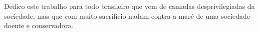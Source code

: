 
\hypersetup{pageanchor=false}

\capaime[port]

%



\begin{dedicatoria}
Dedico este trabalho para todo brasileiro que vem de camadas desprivilegiadas da sociedade, mas que com muito sacrifício nadam contra a maré de uma sociedade doente e conservadora. 
\end{dedicatoria}

\hypersetup{pageanchor=true}

